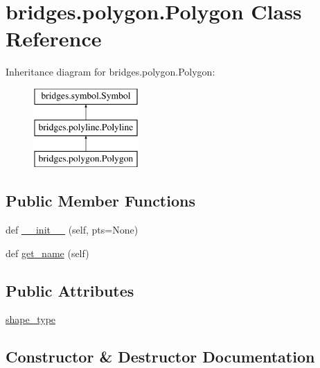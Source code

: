 \hypertarget{classbridges_1_1polygon_1_1_polygon}{}\section{bridges.\+polygon.\+Polygon Class Reference}
\label{classbridges_1_1polygon_1_1_polygon}
Inheritance diagram for bridges.\+polygon.\+Polygon\+:\begin{figure}[H]
\begin{center}
\leavevmode
\includegraphics[height=3.000000cm]{classbridges_1_1polygon_1_1_polygon}
\end{center}
\end{figure}
\subsection*{Public Member Functions}
\begin{DoxyCompactItemize}
\item 
def \mbox{\hyperlink{classbridges_1_1polygon_1_1_polygon_a6e2515889df5d8626a32de2d4b36abc1}{\+\_\+\+\_\+init\+\_\+\+\_\+}} (self, pts=None)
\item 
def \mbox{\hyperlink{classbridges_1_1polygon_1_1_polygon_afa0d94f62a19b24ad3764bc900718346}{get\+\_\+name}} (self)
\end{DoxyCompactItemize}
\subsection*{Public Attributes}
\begin{DoxyCompactItemize}
\item 
\mbox{\hyperlink{classbridges_1_1polygon_1_1_polygon_ae9c67cb9337ec5deebf1e334e84b3635}{shape\+\_\+type}}
\end{DoxyCompactItemize}


\subsection{Constructor \& Destructor Documentation}
\mbox{\label{classbridges_1_1polygon_1_1_polygon_a6e2515889df5d8626a32de2d4b36abc1}} 
